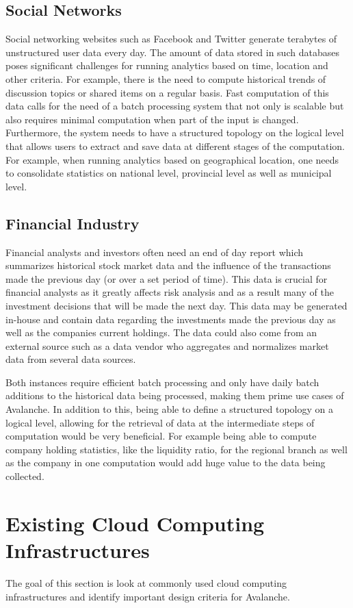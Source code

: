 \documentclass[a4paper]{article}
\begin{document}
\subsection{Social Networks}
Social networking websites such as Facebook and Twitter generate terabytes of unstructured user data every day. The amount of data stored in such databases poses significant challenges for running analytics based on time, location and other criteria. For example, there is the need to compute historical trends of discussion topics or shared items on a regular basis. Fast computation of this data calls for the need of a batch processing system that not only is scalable but also requires minimal computation when part of the input is changed. Furthermore, the system needs to have a structured topology on the logical level that allows users to extract and save data at different stages of the computation. For example, when running analytics based on geographical location, one needs to consolidate statistics on national level, provincial level as well as municipal level.

\subsection{Financial Industry}
Financial analysts and investors often need an end of day report which summarizes historical stock market data and the influence of the transactions made the previous day (or over a set period of time). This data is crucial for financial analysts as it greatly affects risk analysis and as a result many of the investment decisions that will be made the next day.  This data may be generated in-house and contain data regarding the investments made the previous day as well as the companies current holdings.  The data could also come from an external source such as a data vendor who aggregates and normalizes market data from several data sources.  

Both instances require efficient batch processing and only have daily batch additions to the historical data being processed, making them prime use cases of Avalanche.  In addition to this, being able to define a structured topology on a logical level, allowing for the retrieval of data at the intermediate steps of computation would be very beneficial.  For example being able to compute company holding statistics, like the liquidity ratio, for the regional branch as well as the company in one computation would add huge value to the data being collected.

\section{Existing Cloud Computing Infrastructures}
The goal of this section is look at commonly used cloud computing infrastructures and identify important design criteria for Avalanche.  
\end{document}
